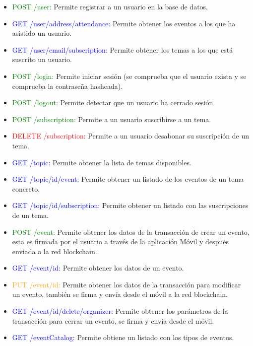 \begin{itemize}
\item \textcolor{green}{{\footnotesize POST} /user:} Permite registrar a un usuario en la base de datos.
\item \textcolor{blue}{{\footnotesize GET} /user/{address}/attendance:} Permite obtener los eventos a los que ha asistido un usuario.
\item \textcolor{blue}{{\footnotesize GET} /user/{email}/subscription:} Permite obtener los temas a los que está suscrito un usuario.
\item \textcolor{green}{{\footnotesize POST} /login:} Permite iniciar sesión (se comprueba que el usuario exista y se comprueba la contraseña hasheada).
\item \textcolor{green}{{\footnotesize POST} /logout:} Permite detectar que un usuario ha cerrado sesión.
\item \textcolor{green}{{\footnotesize POST} /subscription:} Permite a un usuario suscribirse a un tema.
\item \textcolor{red}{{\footnotesize DELETE} /subscription:} Permite a un usuario desabonar su suscripción de un tema.
\item \textcolor{blue}{{\footnotesize GET} /topic:} Permite obtener la lista de temas disponibles.
\item \textcolor{blue}{{\footnotesize GET} /topic/{id}/event:} Permite obtener un listado de los eventos de un tema concreto.
\item \textcolor{blue}{{\footnotesize GET} /topic/{id}/subscription:} Permite obtener un listado con las suscripciones de un tema.
\item \textcolor{green}{{\footnotesize POST} /event:} Permite obtener los datos de la transacción de crear un evento, esta es firmada por el usuario a través de la aplicación Móvil y después enviada a la red blockchain. 
\item \textcolor{blue}{{\footnotesize GET} /event/{id}:} Permite obtener los datos de un evento.
\item \textcolor{orange}{{\footnotesize PUT} /event/{id}:} Permite obtener los datos de la transacción para modificar un evento, también se firma y envía desde el móvil a la red blockchain. 
\item \textcolor{blue}{{\footnotesize GET} /event/{id}/delete/{organizer}:} Permite obtener los parámetros de la transacción para cerrar un evento, se firma y envía desde el móvil.
\item \textcolor{blue}{{\footnotesize GET} /eventCatalog:} Permite obtiene un listado con los tipos de eventos. 

\end{itemize}
